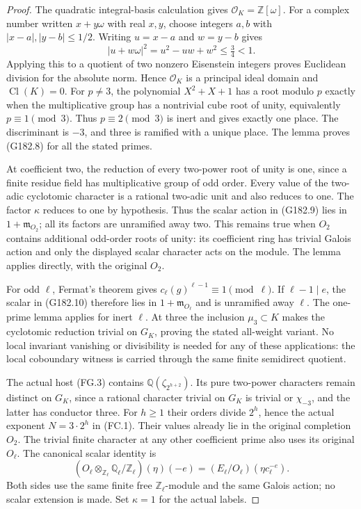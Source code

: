 \begin{proof}
The quadratic integral-basis calculation gives
$\mathcal O_K=\mathbb Z[\omega]$.
For a complex number written $x+y\omega$ with real $x,y$, choose
integers $a,b$ with $|x-a|,|y-b|\leq1/2$.
Writing $u=x-a$ and $w=y-b$ gives
\[
        |u+w\omega|^2=u^2-uw+w^2\leq\tfrac34<1.
 \tag{G182.11}
\]
Applying this to a quotient of two nonzero Eisenstein integers proves
Euclidean division for the absolute norm.
Hence $\mathcal O_K$ is a principal ideal domain and
$\operatorname{Cl}(K)=0$.
For $p\ne3$, the polynomial $X^2+X+1$ has a root modulo $p$
exactly when the multiplicative group has a nontrivial cube root of
unity, equivalently $p\equiv1\pmod3$.
Thus $p\equiv2\pmod3$ is inert and gives exactly one place.
The discriminant is $-3$, and three is ramified with a unique place.
The lemma proves (G182.8) for all the stated primes.

At coefficient two, the reduction of every two-power root of unity
is one, since a finite residue field has multiplicative group of odd
order.  Every value of the two-adic cyclotomic character is a rational
two-adic unit and also reduces to one.
The factor $\kappa$ reduces to one by hypothesis.
Thus the scalar action in (G182.9) lies in $1+\mathfrak m_{O_2}$;
all its factors are unramified away two.
This remains true when $O_2$ contains additional odd-order roots of
unity: its coefficient ring has trivial Galois action and only the
displayed scalar character acts on the module.
The lemma applies directly, with the original $O_2$.

For odd $\ell$, Fermat's theorem gives
$c_\ell(g)^{\ell-1}\equiv1\pmod\ell$.
If $\ell-1\mid e$, the scalar in (G182.10) therefore lies in
$1+\mathfrak m_{O_\ell}$ and is unramified away $\ell$.
The one-prime lemma applies for inert $\ell$.
At three the inclusion $\mu_3\subset K$ makes the cyclotomic
reduction trivial on $G_K$, proving the stated all-weight variant.
No local invariant vanishing or divisibility is needed for any of
these applications: the local coboundary witness is carried through
the same finite semidirect quotient.

The actual host (FG.3) contains $\mathbb Q(\zeta_{2^{h+2}})$.
Its pure two-power characters remain distinct on $G_K$, since a
rational character trivial on $G_K$ is trivial or $\chi_{-3}$,
and the latter has conductor three.
For $h\geq1$ their orders divide $2^h$, hence the actual exponent
$N=3\cdot2^h$ in (FC.1).
Their values already lie in the original completion $O_2$.
The trivial finite character at any other coefficient prime also
uses its original $O_\ell$.
The canonical scalar identity is
\[
 (O_\ell\otimes_{\mathbb Z_\ell}\mathbb Q_\ell/\mathbb Z_\ell)
                    (\eta)(-e)
       =(E_\ell/O_\ell)(\eta c_\ell^{-e}).
 \tag{G182.12}
\]
Both sides use the same finite free $\mathbb Z_\ell$-module and the
same Galois action; no scalar extension is made.
Set $\kappa=1$ for the actual labels.


\end{proof}
